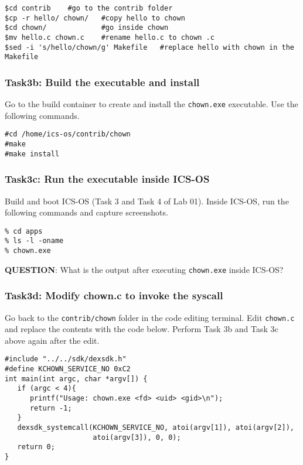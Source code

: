 \documentclass[a4paper, 11pt,oneside]{article}
\begin{document}
\begin{verbatim}
$cd contrib	   #go to the contrib folder
$cp -r hello/ chown/   #copy hello to chown
$cd chown/             #go inside chown
$mv hello.c chown.c    #rename hello.c to chown .c
$sed -i 's/hello/chown/g' Makefile   #replace hello with chown in the Makefile
\end{verbatim}

\subsubsection*{Task3b: Build the executable and install}
Go to the build container to create and install the \texttt{chown.exe} 
executable. Use the following commands.
\begin{verbatim}
#cd /home/ics-os/contrib/chown
#make
#make install
\end{verbatim}

\subsubsection*{Task3c: Run the executable inside ICS-OS}
Build and boot ICS-OS (Task 3 and Task 4 of Lab 01). Inside ICS-OS, run the 
following commands and capture screenshots.

\begin{verbatim}
% cd apps
% ls -l -oname
% chown.exe
\end{verbatim}

\textbf{QUESTION}: What is the output after executing \texttt{chown.exe} inside 
ICS-OS? \newline

\subsubsection*{Task3d: Modify chown.c to invoke the syscall}
Go back to the \texttt{contrib/chown} folder in the code editing terminal. Edit 
\texttt{chown.c} and replace the contents with the code below. Perform Task 3b 
and Task 3c above again after the edit.

\begin{verbatim}
#include "../../sdk/dexsdk.h"
#define KCHOWN_SERVICE_NO 0xC2
int main(int argc, char *argv[]) {
   if (argc < 4){ 
      printf("Usage: chown.exe <fd> <uid> <gid>\n");
      return -1; 
   }   
   dexsdk_systemcall(KCHOWN_SERVICE_NO, atoi(argv[1]), atoi(argv[2]), 
                     atoi(argv[3]), 0, 0); 
   return 0;
}
\end{verbatim}
\end{document}
